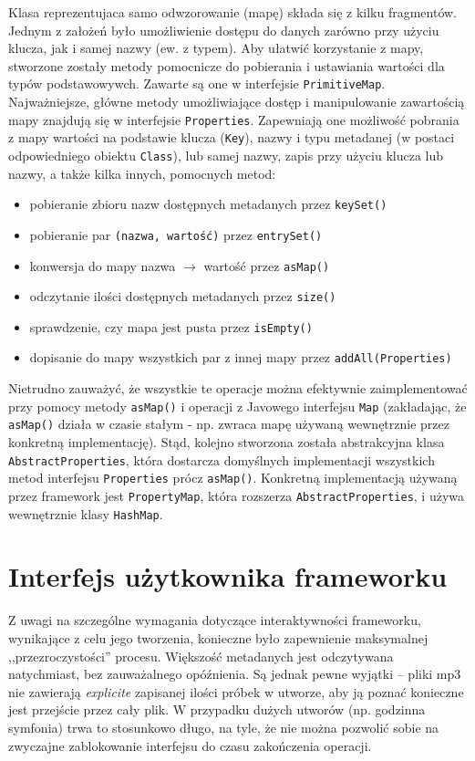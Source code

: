 Klasa reprezentujaca samo odwzorowanie (mapę) składa się z kilku fragmentów. Jednym z założeń było
umożliwienie dostępu do danych zarówno przy użyciu klucza, jak i samej nazwy (ew. z typem). Aby
ułatwić korzystanie z mapy, stworzone zostały metody pomocnicze do pobierania i ustawiania wartości
dla typów podstawowywch. Zawarte są one w interfejsie \texttt{PrimitiveMap}. Najważniejsze, główne
metody umożliwiające dostęp i manipulowanie zawartością mapy znajdują się w interfejsie
\texttt{Properties}. Zapewniają one możliwość pobrania z mapy wartości na podstawie klucza
(\texttt{Key}), nazwy i typu metadanej (w postaci odpowiedniego obiektu \texttt{Class}), lub samej
nazwy, zapis przy użyciu klucza lub nazwy, a także kilka innych, pomocnych metod:

\begin{itemize}
  \item pobieranie zbioru nazw dostępnych metadanych przez \texttt{keySet()}
  \item pobieranie par \texttt{(nazwa, wartość)} przez \texttt{entrySet()} 
  \item konwersja do mapy nazwa $\to$ wartość przez \texttt{asMap()}
  \item odczytanie ilości dostępnych metadanych przez \texttt{size()}
  \item sprawdzenie, czy mapa jest pusta przez \texttt{isEmpty()}
  \item dopisanie do mapy wszystkich par z innej mapy przez \texttt{addAll(Properties)}
\end{itemize}

Nietrudno zauważyć, że wszystkie te operacje można efektywnie zaimplementować przy pomocy metody
\texttt{asMap()} i operacji z Javowego interfejsu \texttt{Map} (zakładając, że \texttt{asMap()}
działa w czasie stałym - np. zwraca mapę używaną wewnętrznie przez konkretną implementację). Stąd,
kolejno stworzona została abstrakcyjna klasa \texttt{AbstractProperties}, która dostarcza domyślnych
implementacji wszystkich metod interfejsu \texttt{Properties} prócz \texttt{asMap()}. Konkretną
implementacją używaną przez framework jest \texttt{PropertyMap}, która rozszerza
\texttt{AbstractProperties}, i używa wewnętrznie klasy \texttt{HashMap}.


\section{Interfejs użytkownika frameworku}

Z uwagi na szczególne wymagania dotyczące interaktywności frameworku, wynikające z celu jego
tworzenia, konieczne było zapewnienie maksymalnej ,,przezroczystości'' procesu.  Większość
metadanych jest odczytywana natychmiast, bez zauważalnego opóźnienia. Są jednak pewne wyjątki --
pliki mp3 nie zawierają \textit{explicite} zapisanej ilości próbek w utworze, aby ją poznać
konieczne jest przejście przez cały plik. W przypadku dużych utworów (np. godzinna symfonia) trwa to
stosunkowo długo, na tyle, że nie można pozwolić sobie na zwyczajne zablokowanie interfejsu do czasu
zakończenia operacji.

